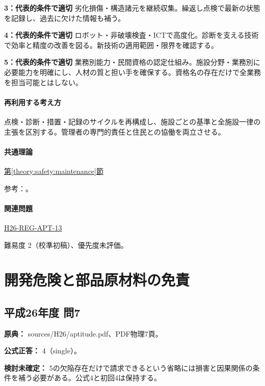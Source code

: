 \noindent\textbf{3：代表的条件で適切} 劣化損傷・構造諸元を継続収集。繰返し点検で最新の状態を記録し、過去に欠けた情報も補う。\par

\noindent\textbf{4：代表的条件で適切} ロボット・非破壊検査・ICTで高度化。診断を支える技術で効率と精度の改善を図る。新技術の適用範囲・限界を確認する。\par

\noindent\textbf{5：代表的条件で適切} 業務別能力・民間資格の認定仕組み。施設分野・業務別に必要能力を明確にし、人材の質と担い手を確保する。資格名の存在だけで全業務を担当可能とはしない。\par

\paragraph{再利用する考え方} 点検・診断・措置・記録のサイクルを再構成し、施設ごとの基準と全施設一律の主張を区別する。管理者の専門的責任と住民との協働を両立させる。

\paragraph{共通理論} \hyperref[theory:safety:maintenance]{第\ref*{theory:safety:maintenance}節}

\par 参考：\cite{eng52_infra2014}。

\paragraph{関連問題} \hyperref[q:h26-reg-apt-13]{H26-REG-APT-13}

\par 難易度 2（校準初稿）、優先度未評価。

\section{開発危険と部品原材料の免責}

\subsection{平成26年度 問7}
\label{q:h26-reg-apt-07}

\noindent\textbf{原典：} sources/H26/aptitude.pdf、PDF物理7頁。

\textbf{公式正答：} 4（single）。

\par\textbf{検討未確定：} 5の欠陥存在だけで請求できるという省略には損害と因果関係の条件を補う必要がある。公式4と初回4は保持する。

